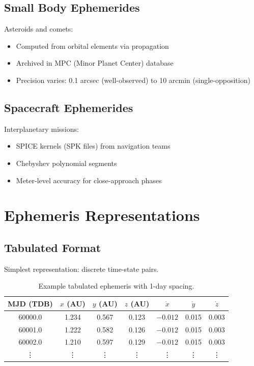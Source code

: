\subsection{Small Body Ephemerides}

Asteroids and comets:
\begin{itemize}
    \item Computed from orbital elements via propagation
    \item Archived in MPC (Minor Planet Center) database
    \item Precision varies: 0.1 arcsec (well-observed) to 10 arcmin (single-opposition)
\end{itemize}

\subsection{Spacecraft Ephemerides}

Interplanetary missions:
\begin{itemize}
    \item SPICE kernels (SPK files) from navigation teams
    \item Chebyshev polynomial segments
    \item Meter-level accuracy for close-approach phases
\end{itemize}

\section{Ephemeris Representations}

\subsection{Tabulated Format}

Simplest representation: discrete time-state pairs.

\begin{table}[htbp]
\centering
\begin{tabular}{ccccccc}
\toprule
\textbf{MJD (TDB)} & $x$ (AU) & $y$ (AU) & $z$ (AU) & $\dot{x}$ & $\dot{y}$ & $\dot{z}$ \\
\midrule
60000.0 & 1.234 & 0.567 & 0.123 & $-0.012$ & 0.015 & 0.003 \\
60001.0 & 1.222 & 0.582 & 0.126 & $-0.012$ & 0.015 & 0.003 \\
60002.0 & 1.210 & 0.597 & 0.129 & $-0.012$ & 0.015 & 0.003 \\
\vdots & \vdots & \vdots & \vdots & \vdots & \vdots & \vdots \\
\bottomrule
\end{tabular}
\caption{Example tabulated ephemeris with 1-day spacing.}
\label{tab:ephemeris_table}
\end{table}

